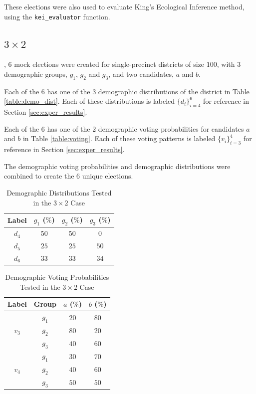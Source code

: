 These elections were also used to evaluate King's Ecological Inference method, using the \texttt{kei\_evaluator} function.

\FloatBarrier
\subsection{$3 \times 2$}
\label{subsec:three_by_two}

, $6$ mock elections were created for single-precinct districts of size $100$, with $3$ demographic groups, $g_1$, $g_2$ and $g_3$, and two candidates, $a$ and $b$.

Each of the $6$ has one of the $3$ demographic distributions of the district in Table \ref{table:demo_dist}. Each of these distributions is labeled $\{d_i\}_{i=4}^6$ for reference in Section \ref{sec:exper_results}.

Each of the $6$ has one of the $2$ demographic voting probabilities for candidates $a$ and $b$ in Table \ref{table:voting}. Each of these voting patterns is labeled $\{v_i\}_{i=3}^4$ for reference in Section \ref{sec:exper_results}.

The demographic voting probabilities and demographic distributions were combined to create the $6$ unique elections.

\begin{table}[ht]
 \centering
 \caption{Demographic Distributions Tested in the $3 \times 2$ Case}
 \label{table:demo_dist_3}
 \begin{tabular}{|c|c|c|c|}
   \hline
   Label & $g_1$ ($\%$) & $g_2$ ($\%$) & $g_3$ ($\%$) \\
   \hline
   $d_4$ & $50$ & $50$ & $0$ \\
   $d_5$ & $25$ & $25$ & $50$ \\
   $d_6$ & $33$ & $33$ & $34$ \\
  \hline
 \end{tabular}
\end{table}

\begin{table}[ht]
 \centering
 \caption{Demographic Voting Probabilities Tested in the $3 \times 2$ Case}
 \label{table:voting_3}
 \begin{tabular}{|c|c|c|c|}
   \hline
   Label & Group & $a$ ($\%$) & $b$ ($\%$) \\
   \hline
   \multirow{3}{*}{$v_3$} & $g_1$ & $20$ & $80$ \\
   & $g_2$ & $80$ & $20$ \\
   & $g_3$ & $40$ & $60$ \\
   \hline
   \multirow{3}{*}{$v_4$} & $g_1$ & $30$ & $70$ \\
   & $g_2$ & $40$ & $60$ \\
   & $g_3$ & $50$ & $50$ \\
  \hline
 \end{tabular}
\end{table}

